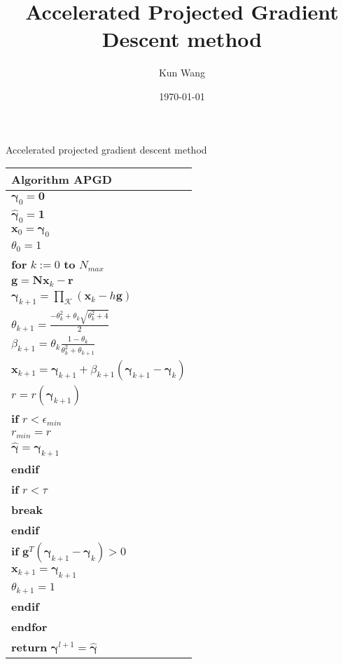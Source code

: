 \documentclass[12pt]{article}
\title{Accelerated Projected Gradient Descent method}
\author{Kun Wang}
\date{\today}
\begin{document}
        \maketitle
        \noindent Accelerated projected gradient descent method
        \begin{center}
            \begin{tabularx}{\textwidth}{|X|}
                \hline
                \textbf{Algorithm APGD}\\
                \hline
                $\boldsymbol{\gamma}_0=\mathbf{0}$\\
                $\hat{\boldsymbol{\gamma}}_0=\mathbf{1}$\\
                $\mathbf{x}_0=\boldsymbol{\gamma}_0$\\
                $\theta_0=1$\\
                \textbf{for} $k:=0$ \textbf{to} $N_{max}$\\
                \qquad $\mathbf{g}=\mathbf{N}\mathbf{x}_k-\mathbf{r}$\\
                \qquad $\boldsymbol{\gamma}_{k+1}=\prod_\mathcal{K}(\mathbf{x}_k-h\mathbf{g})$\\
                \qquad $\theta_{k+1}=\frac{-\theta_k^2+\theta_k\sqrt{\theta_k^2+4}}{2}$\\
                \qquad $\beta_{k+1}=\theta_k\frac{1-\theta_k}{\theta_k^2+\theta_{k+1}}$\\
                \qquad $\mathbf{x}_{k+1}=\boldsymbol{\gamma}_{k+1}+\beta_{k+1}(\boldsymbol{\gamma}_{k+1}-\boldsymbol{\gamma}_k)$\\
                \qquad $r=r(\boldsymbol{\gamma}_{k+1})$\\
                \qquad \textbf{if} $r<\epsilon_{min}$\\
                \qquad\qquad $r_{min}=r$\\
                \qquad\qquad $\hat{\boldsymbol{\gamma}}=\boldsymbol{\gamma}_{k+1}$\\
                \qquad \textbf{endif}\\
                \qquad \textbf{if} $r<\tau$\\
                \qquad\qquad \textbf{break}\\
                \qquad \textbf{endif}\\
                \qquad \textbf{if} $\mathbf{g}^T(\boldsymbol{\gamma}_{k+1}-\boldsymbol{\gamma}_k)>0$\\
                \qquad\qquad $\mathbf{x}_{k+1}=\boldsymbol{\gamma}_{k+1}$\\
                \qquad\qquad $\theta_{k+1}=1$\\
                \qquad \textbf{endif}\\
                \textbf{endfor}\\
                \textbf{return} $\boldsymbol{\gamma}^{l+1}=\hat{\boldsymbol{\gamma}}$\\
                \hline
            \end{tabularx}
        \end{center}
\end{document}

